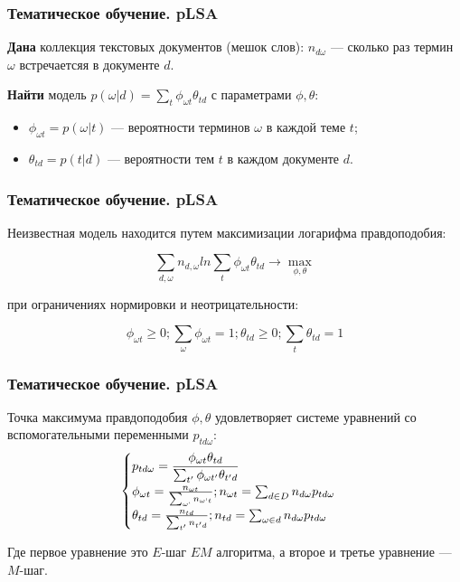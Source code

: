 \documentclass[ucs, notheorems, handout]{beamer}
\begin{document}
			\begin{frame}
	\frametitle{Тематическое обучение. pLSA}
	

\textbf{Дана} коллекция текстовых документов (мешок слов): $n_{d\omega}$ --- сколько раз термин $\omega$ встречаетсяя в документе $d$.

\textbf{Найти} модель $p(\omega | d) = \sum_t \phi_{\omega t}\theta_{td}$ с параметрами $\phi, \theta$:

\begin{itemize}
	\item $\phi_{\omega t} = p(\omega | t)$  --- вероятности терминов $\omega$ в каждой теме $t$;
	\item $\theta_{td} = p(t | d)$ --- вероятности тем $t$ в каждом документе $d$.
\end{itemize}

	\end{frame}
	
	\begin{frame}
	\frametitle{Тематическое обучение. pLSA}
	

Неизвестная модель находится путем максимизации логарифма правдоподобия:

$$ \sum_{d,\omega} n_{d,\omega} ln \sum_{t} \phi_{\omega t}\theta_{td} \rightarrow  \max_{\phi, \theta}$$

при ограничениях нормировки и неотрицательности:

$$ \phi_{\omega t} \geq 0; \sum_{\omega} \phi_{\omega t} = 1; \theta_{td} \geq 0; \sum_{t} \theta_{td} = 1$$

	\end{frame}
	
		\begin{frame}
	\frametitle{Тематическое обучение. pLSA}
	
Точка максимума правдоподобия $\phi, \theta$ удовлетворяет системе уравнений со вспомогательными переменными $p_{td\omega}$:
$$
\begin{cases}
\displaystyle
p_{td\omega}={ {\phi_{\omega t} \theta_{td} } \over { \sum_{t'} \phi_{\omega t'} \theta_{t'd}}}\\
\phi_{\omega t} = { {n_{\omega t}} \over {\sum_{\omega `} n_{\omega `t}}}; n_{\omega t} = \sum_{d \in D} n_{d\omega}p_{td\omega}\\
\theta_{td} = { {n_{td}} \over {\sum_{t'}n_{t'd}}}; n_{td} = \sum_{\omega \in d} n_{d\omega}p_{td\omega}
\end{cases}
$$

Где первое уравнение это $E$-шаг $EM$ алгоритма, а второе и третье уравнение --- $M$-шаг.

	\end{frame}
	
\end{document}
